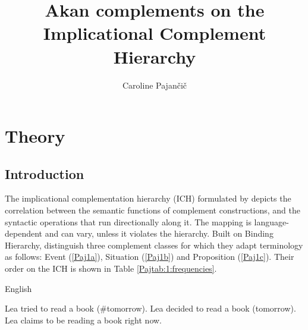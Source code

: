 \documentclass[output=paper]{langscibook}
\author{Caroline Pajančič\affiliation{University of Vienna}}
\title{Akan complements on the Implicational Complement Hierarchy}
\begin{document}
\newcommand{\compl}{\textsc{compl}}
\newcommand{\comp}{\textsc{comp}}
\newcommand{\pl}{\textsc{pl}}
\newcommand{\subj}{\textsc{subj}}
\newcommand{\fut}{\textsc{fut}}
\newcommand{\sg}{\textsc{sg}}
\newcommand{\tsc}{\textsc}
\newcommand{\prog}{\textsc{prog}}
\def\checkmark{\tikz\fill[scale=0.4](0,.35) -- (.25,0) -- (1,.7) -- (.25,.15) -- cycle;} 
\maketitle

\section{Theory}
\label{Pajsect:1}

\subsection{Introduction}
The implicational complementation hierarchy (ICH) formulated by \citet{wurmbrandlohninger2020} depicts the correlation between the semantic functions of complement constructions, and the syntactic operations that run directionally along it. The mapping is language-dependent and can vary, unless it violates the hierarchy. Built on  \citeyear{givon1980} Binding Hierarchy, \citet{wurmbrandlohninger2020} distinguish three complement classes for which they adapt  \citeyear{ramchandsvenonius2014} terminology as follows: Event (\ref{Paj1a}), Situation (\ref{Paj1b}) and Proposition (\ref{Paj1c}). Their order on the ICH is shown in Table \ref{Pajtab:1:frequencies}. 

\begin{exe}
\ex English
\begin{xlist}
\ex \label{Paj1a}
Lea tried to read a book (\#tomorrow).
\ex \label{Paj1b}
Lea decided to read a book (tomorrow). 
\ex \label{Paj1c}
Lea claims to be reading a book right now. 
\end{xlist}
\end{exe}
\end{document}
